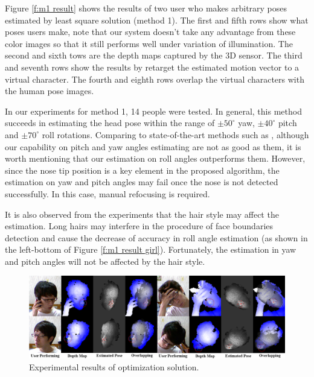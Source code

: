 Figure \ref{f:m1 result} shows the results of two user who makes arbitrary poses estimated by least square solution (method 1). The first and fifth rows show what poses users make, note that our system doesn't take any advantage from these color images so that it still performs well under variation of illumination. The second and sixth tows are the depth maps captured by the 3D sensor. The third and seventh rows show the results by retarget the estimated motion vector to a virtual character. The fourth and eighth rows overlap the virtual characters with the human pose images.

In our experiments for method 1, 14 people were tested. In general, this method succeeds in estimating the head pose within the range of $\pm 50^{\circ}$ yaw, $\pm 40^{\circ}$ pitch and $\pm 70^{\circ}$ roll rotations. Comparing to state-of-the-art methods such as \cite{Breitenstein:08:RTFPEFSRI, Fanelli:11:RTHPEWRRF, fanelli_DAGM11}, although our capability on pitch and yaw angles estimating are not as good as them, it is worth mentioning that our estimation on roll angles outperforms them. However, since the nose tip position is a key element in the proposed algorithm, the estimation on yaw and pitch angles may fail once the nose is not detected successfully. In this case, manual refocusing is required. 

It is also observed from the experiments that the hair style may affect the estimation. Long hairs may interfere in the procedure of face boundaries detection and cause the decrease of accuracy in roll angle estimation (as shown in the left-bottom of Figure \ref{f:m1 result girl}). Fortunately, the estimation in yaw and pitch angles will not be affected by the hair style.

\begin{figure}
\includegraphics[width=1.0\linewidth]{./figure/m2_result_tuyu.png}
\caption{Experimental results of optimization solution.}
\label{f:m2 result tantofish}       %
\end{figure}


